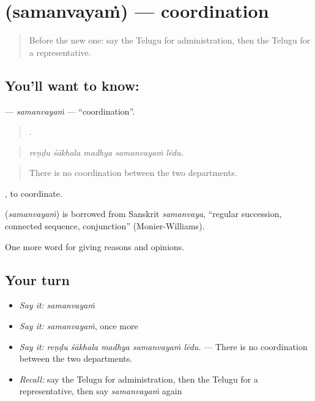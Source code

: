 \section[\texorpdfstring{\te{సమన్వయం} (samanvayaṁ)}{సమన్వయం (samanvayaṁ)}]{ (samanvayaṁ) — coordination}

\label{lesson:TE-C403-samanvayam}



\begin{quote}
Before the new one: say the Telugu for administration, then the Telugu for a representative.
\end{quote}

\subsection*{You'll want to know: }
\textbf{} — \emph{samanvayaṁ} — \textquotedblleft{}coordination\textquotedblright{}.

\begin{quote}
    .
\end{quote}

\begin{quote}
\emph{reṇḍu śākhala madhya samanvayaṁ lēdu.}
\end{quote}

\begin{quote}
There is no coordination between the two departments.
\end{quote}

 , to coordinate.

\begin{cousinweb}
\textbf{} (\emph{samanvayaṁ}) is borrowed from Sanskrit \emph{samanvaya}, \textquotedblleft{}regular succession, connected sequence, conjunction\textquotedblright{} (Monier-Williams).
\end{cousinweb}

\begin{grammarlens}[title={What you've built}]
One more word for giving reasons and opinions.
\end{grammarlens}

\subsection*{Your turn}
\begin{itemize}
\raggedright
  \item \emph{Say it:} \emph{samanvayaṁ}
  \item \emph{Say it:} \emph{samanvayaṁ}, once more
  \item \emph{Say it:} \emph{reṇḍu śākhala madhya samanvayaṁ lēdu.} — There is no coordination between the two departments.
  \item \emph{Recall:} say the Telugu for administration, then the Telugu for a representative, then say \emph{samanvayaṁ} again
\end{itemize}

